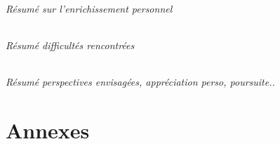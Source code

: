 \documentclass[
	headsepline=on,
	footsepline=on,
	twoside=off,
	abstract=on,
	DIV=10
]{scrreprt}
\begin{document}
			\paragraph{Résumé sur l'enrichissement personnel}
			
			\paragraph{Résumé difficultés rencontrées}
			
			\paragraph{Résumé perspectives envisagées, appréciation perso, poursuite..}
		
			\cleardoublepage
			\pagebreak
			
		\part{Annexes}
		
			
	
	
	
	
	
	
	
	
	
\end{document}
